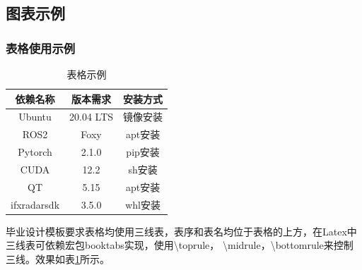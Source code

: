 \begin{thesischapter}
    \subsection{图表示例}
    \subsubsection{表格使用示例}
    \begin{table}[h]
        \centering
        \songti{}
        \caption{表格示例}
        \begin{tabular}{ccc}
            \toprule
            依赖名称 & 版本需求 & 安装方式 \\
            \midrule
            Ubuntu & 20.04 LTS & 镜像安装 \\
            ROS2 & Foxy & apt安装 \\
            Pytorch & 2.1.0 & pip安装 \\
            CUDA & 12.2 & sh安装 \\
            QT & 5.15 & apt安装 \\
            ifxradarsdk & 3.5.0 & whl安装 \\
            \bottomrule
        \end{tabular}
        \label{tab:sample}
    \end{table}
    毕业设计模板要求表格均使用三线表，表序和表名均位于表格的上方，在Latex中三线表可依赖宏包booktabs实现，使用\textbackslash toprule，
\textbackslash midrule，\textbackslash bottomrule来控制三线。效果如表\ref{tab:sample}所示。 

\end{thesischapter}
